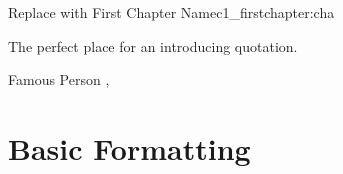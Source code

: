 


\begin{chapterpage}{Replace with First Chapter Name}{c1_firstchapter:cha}

\begin{myquotation} The perfect place for an introducing quotation.\par\vspace*{15mm}
\mbox{}\hfill \emdash{}Famous Person
, %
\par\end{myquotation}

\end{chapterpage}



\section{Basic Formatting}\label{c1_basicformatting:sec}

